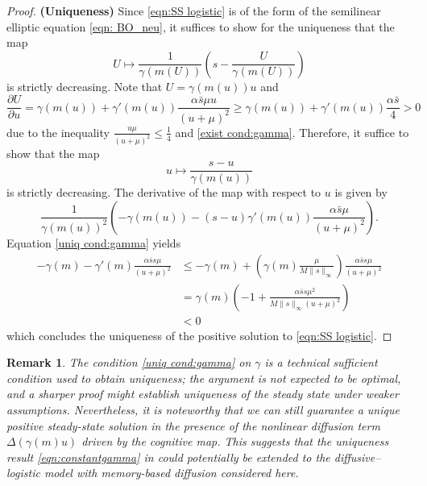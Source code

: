 \documentclass{article}
\newtheorem{remark}{Remark}
\begin{document}
\begin{proof}
    \textbf{(Uniqueness)} Since \eqref{eqn:SS logistic} is of the form of the semilinear elliptic equation \eqref{eqn: BO_neu}, it suffices to show for the uniqueness that the map
    \begin{equation*}
        U\mapsto \frac{1}{\gamma(m(U))}\left(s-\frac{U}{\gamma(m(U))}\right)
    \end{equation*} is strictly decreasing. Note that $U=\gamma(m(u))u$ and 
    \begin{equation*}
        \frac{\partial U}{\partial u} = \gamma(m(u)) + \gamma'(m(u))\frac{\alpha\bar s \mu u}{(u+\mu)^2}\ge \gamma(m(u)) + \gamma'(m(u))\frac{\alpha\bar s }{4}>0
    \end{equation*} due to the inequality $\frac{u\mu}{(u+\mu)^2}\le \frac{1}{4}$ and \eqref{exist cond:gamma}. Therefore, it suffice to show that the map
    \begin{equation*}
        u\mapsto \frac{s-u}{\gamma(m(u))}
    \end{equation*} is strictly decreasing. The derivative of the map with respect to $u$ is given by
    \begin{equation*}
        \frac{1}{\gamma(m(u))^2}\left( -\gamma(m(u))-(s-u)\gamma'(m(u))\frac{\alpha \bar s \mu}{(u+\mu)^2}\right).
    \end{equation*}
    Equation \eqref{uniq cond:gamma} yields
    \begin{align*}
        -\gamma(m) -\gamma'(m)\frac{\alpha \bar s s\mu}{(u+\mu)^2}&\le -\gamma(m) +\left(\gamma(m)\frac{\mu}{M \|s\|_\infty}\right)\frac{\alpha \bar s s\mu}{(u+\mu)^2}\\
        &=\gamma(m)\left(-1 + \frac{\alpha\bar s s \mu^2}{M\|s\|_\infty (u+\mu)^2}\right)\\
        &<0
    \end{align*}
    which concludes the uniqueness of the positive solution to \eqref{eqn:SS logistic}.

    
\end{proof}

\begin{remark} 
    The condition \eqref{uniq cond:gamma} on $\gamma$ is a technical sufficient condition used to obtain uniqueness; the argument is not expected to be optimal, and a sharper proof might establish uniqueness of the steady state under weaker assumptions. Nevertheless, it is noteworthy that we can still guarantee a unique positive steady-state solution in the presence of the nonlinear diffusion term $\Delta(\gamma(m)u)$ driven by the cognitive map. This suggests that the uniqueness result  \eqref{eqn:constantgamma} in \cite{Cantrell1989} could potentially be extended to the diffusive--logistic model with memory-based diffusion considered here.
\end{remark}
\end{document}
